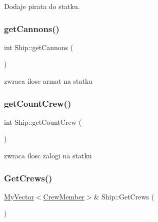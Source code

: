 Dodaje pirata do statku. 

\mbox{\label{class_ship_a7a9dc5f45fa613557853925235a3a752}} 
\subsubsection{\texorpdfstring{get\+Cannons()}{getCannons()}}
{\footnotesize\ttfamily int Ship\+::get\+Cannons (\begin{DoxyParamCaption}{ }\end{DoxyParamCaption})\hspace{0.3cm}{\ttfamily [inline]}}



zwraca ilosc armat na statku 

\mbox{\label{class_ship_a1da55c7ad0c972527a122e0bccc07fcd}} 
\subsubsection{\texorpdfstring{get\+Count\+Crew()}{getCountCrew()}}
{\footnotesize\ttfamily int Ship\+::get\+Count\+Crew (\begin{DoxyParamCaption}{ }\end{DoxyParamCaption})\hspace{0.3cm}{\ttfamily [inline]}}



zwraca ilosc zalogi na statku 

\mbox{\label{class_ship_a2e898baf9c4999fd2a2b14802aabc893}} 
\subsubsection{\texorpdfstring{Get\+Crews()}{GetCrews()}}
{\footnotesize\ttfamily \hyperlink{class_my_vector}{My\+Vector}$<$\hyperlink{class_crew_member}{Crew\+Member}$>$\& Ship\+::\+Get\+Crews (\begin{DoxyParamCaption}{ }\end{DoxyParamCaption})\hspace{0.3cm}{\ttfamily [inline]}}

\mbox{\label{class_ship_ae99c45d37b4d1bd79a74d4745251b59c}} 
